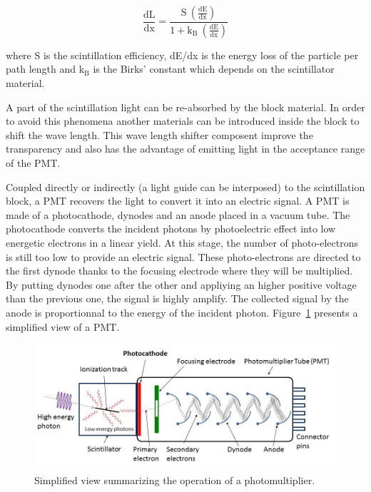 \documentclass[main.tex]{subfiles}
\begin{document}
\begin{equation}
\frac{\text{dL}}{\text{dx}} = \frac{\text{S}~(\frac{\text{dE}}{\text{dx}})}{\text{1}+\text{k}_\text{B}~(\frac{\text{dE}}{\text{dx}})}
\end{equation}


\NI where S is the scintillation efficiency, dE/dx is the energy loss of the particle per path length and k$_\text{B}$ is the Birks' constant which depends on the scintillator material. 


\bigskip


\NI A part of the scintillation light can be re-absorbed by the block material. In order to avoid this phenomena another materials can be introduced inside the block to shift the wave length. This wave length shifter composent improve the transparency and also has the advantage of emitting light in the acceptance range of the PMT. 


\bigskip


\NI Coupled directly or indirectly (a light guide can be interposed) to the scintillation block, a PMT recovers the light to convert it into an electric signal. A PMT is made of a photocathode, dynodes and an anode placed in a vacuum tube. The photocathode converts the incident photons by photoelectric effect into low energetic electrons in a linear yield. At this stage, the number of photo-electrons is still too low to provide an electric signal. These photo-electrons are directed to the first dynode thanks to the focusing electrode where they will be multiplied. By putting dynodes one after the other and appliying an higher positive voltage than the previous one, the signal is highly amplify. The collected signal by the anode is proportionnal to the energy of the incident photon. Figure~\ref{PMT} presents a simplified view of a PMT.


\begin{figure}[h!]
\begin{center}
\includegraphics[scale=0.35]{pictures/Chap3/PhotoMultiplierTubeAndScintillator_v2.jpg}
\caption{Simplified view summarizing the operation of a photomultiplier.}
\label{PMT}
\end{center}
\end{figure}
\end{document}

